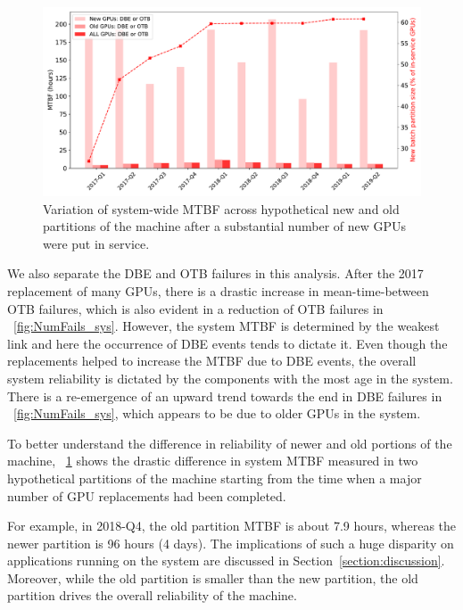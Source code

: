 \begin{figure}[bt]
  \begin{center}
    \includegraphics[trim={0 1em 0 1em},clip,width=\columnwidth]{figs/MTBF_quaterly_sys_NewOldALL_newPart.pdf}
  \end{center}
  \caption{Variation of system-wide MTBF across hypothetical new and
    old partitions of the machine after a substantial number of new GPUs
were put in service. }
  \label{fig:MTBF_sys_NewOld}
\end{figure}
We also separate the DBE and OTB failures in this analysis. After the
2017 replacement of many GPUs, there is a drastic increase in
mean-time-between OTB failures, which is also evident in a reduction of OTB failures in ~\ref{fig:NumFails_sys}.
However, the system MTBF is determined by the weakest link and here the occurrence of DBE events tends to dictate it.
Even though the replacements helped to increase the MTBF due to DBE events, the overall system 
reliability is dictated by the components with the most age in the
system. There is a re-emergence of an upward trend towards 
the end in DBE failures in ~\ref{fig:NumFails_sys}, which
appears to be due to older GPUs in the system. 

To better understand the difference in reliability of newer and old portions of the machine, 
~\ref{fig:MTBF_sys_NewOld} shows the drastic difference in system MTBF measured in two hypothetical
partitions of the machine starting from the time when a major number of GPU replacements had been completed.

For example, in 2018-Q4, the old partition MTBF is about 7.9 hours,
whereas the newer partition is 96 hours (4 days). The implications of such a huge disparity on applications running on the 
system are discussed in
Section~\ref{section:discussion}. Moreover, while the old partition is
smaller than the new partition, the old partition drives the overall reliability of
the machine.
